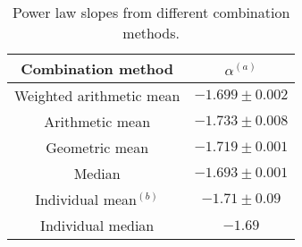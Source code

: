 \begin{table}
\centering
\begin{center}
\caption{Power law slopes from different combination methods.}
\begin{tabular}{cc}
\hline
\noalign{\smallskip}
Combination method &  $\alpha$$^{(a)}$ \\  
\hline


Weighted arithmetic mean  & $-1.699\pm 0.002$   \\
Arithmetic mean  & $-1.733\pm 0.008$   \\
Geometric mean  & $-1.719\pm 0.001$   \\
Median  & $-1.693\pm 0.001$   \\

Individual mean$^{(b)}$  & $-1.71\pm 0.09$   \\
Individual median & $-1.69$   \\
\hline
\hline
\end{tabular}
\end{center}


\end{table}



